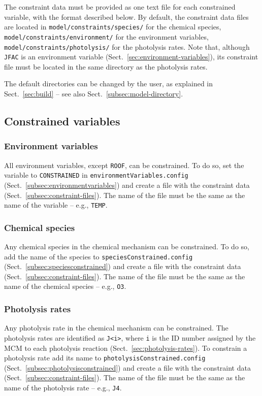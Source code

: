 The constraint data must be provided as one text file for each
constrained variable, with the format described below. By default, the
constraint data files are located in \texttt{model/constraints/species/}
for the chemical species, \texttt{model/constraints/environment/} for
the environment variables, \texttt{model/constraints/photolysis/} for
the photolysis rates. Note that, although \texttt{JFAC} is an
environment variable (Sect.~\ref{sec:environment-variables}), its
constraint file must be located in the same directory as the
photolysis rates.

The default directories can be changed by the user, as explained in
Sect.~\ref{sec:build} -- see also Sect.~\ref{subsec:model-directory}.

\subsection{Constrained variables} \label{subsec:constrained-variables}

\subsubsection{Environment variables}

All environment variables, except \texttt{ROOF}, can be constrained. To do so,
set the variable to \texttt{CONSTRAINED} in \texttt{environmentVariables.config}
(Sect.~\ref{subsec:environmentvariables}) and create a file with the constraint
data (Sect.~\ref{subsec:constraint-files}). The name of the file must be the
same as the name of the variable -- e.g., \texttt{TEMP}.

\subsubsection{Chemical species}

Any chemical species in the chemical mechanism can be constrained. To
do so, add the name of the species to \texttt{speciesConstrained.config}
(Sect.~\ref{subsec:speciesconstrained}) and create a file with the
constraint data (Sect.~\ref{subsec:constraint-files}). The name of the file
must be the same as the name of the chemical species -- e.g., \texttt{O3}.

\subsubsection{Photolysis rates}

Any photolysis rate in the chemical mechanism can be constrained. The
photolysis rates are identified as \texttt{J<i>}, where \texttt{i} is
the ID number assigned by the MCM to each photolysis reaction
(Sect.~\ref{sec:photolysis-rates}). To constrain a photolysis rate add
its name to \texttt{photolysisConstrained.config}
(Sect.~\ref{subsec:photolysisconstrained}) and create a file with the
constraint data (Sect.~\ref{subsec:constraint-files}). The name of the file
must be the same as the name of the photolysis rate -- e.g., \texttt{J4}.\\

